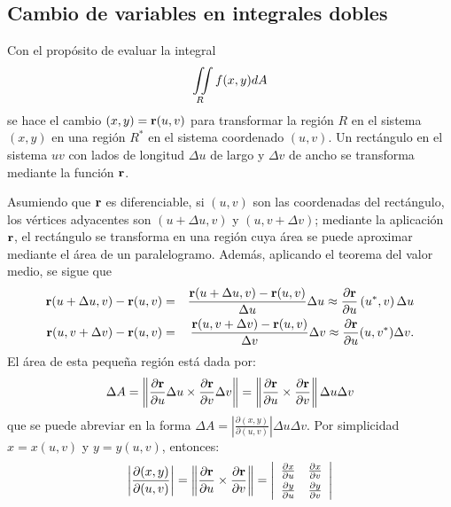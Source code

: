\subsection{Cambio de variables en integrales dobles} \label{cambioidobles}

Con el propósito de evaluar la integral \[\displaystyle \iint\limits_{R}f(x,y) dA\]
se hace el cambio $(x,y) ={\bf r}(u,v)$ para transformar la región $R$ en el sistema
$(x,y) $ en una región $R^{\ast }$ en el sistema coordenado  $(u,v)$.
Un rectángulo en el sistema $uv$ con lados de longitud $\Delta u$ de largo y $\Delta v$ de ancho se transforma mediante la función ${\bf r}$.

Asumiendo que ${\bf r}$ es diferenciable, si $(u,v) $ son las coordenadas del rectángulo, los vértices
adyacentes son $( u+\Delta u,v) $ y $(u,v+\Delta v)$; mediante la aplicación ${\bf r}$, el rectángulo
se transforma en una región cuya área se puede aproximar mediante el área de un paralelogramo. Además,
aplicando el teorema del valor medio, se sigue que
\begin{eqnarray*}
{\bf r}(u+\Delta u,v) -{\bf r}(u,v) &=& \frac{{\bf r}( u+\Delta u,v)-{\bf r}(u,v)}{\Delta u}\Delta u
\approx \frac{\partial {\bf r}}{\partial u}\left( u^{\ast},v\right)\Delta u \\
{\bf r}(u,v+\Delta v) -{\bf r}(u,v) &=& \frac{{\bf r}(u,v+\Delta v)-{\bf r}(u,v)}{\Delta v}\Delta v
\approx \frac{\partial{\bf r}}{\partial u}( u,v^{\ast})\Delta v.
\end{eqnarray*}
El área de esta pequeña región está dada por:
\begin{equation}
\Delta A=\left\Vert \frac{\partial {\bf r}}{\partial u}\Delta u\times
\frac{\partial {\bf r}}{\partial v}\Delta v\right\Vert =\left\Vert \frac{\partial {\bf r}}{\partial u}\times \frac{\partial {\bf r}}{\partial v}\right\Vert \Delta u\Delta v
\end{equation}
que se puede abreviar en la forma
$\Delta A=\left\vert \frac{\partial (x,y)}{\partial (u,v)}\right \vert \Delta u\Delta v$.
Por simplicidad $x=x(u,v)$ y $y=y(u,v)$, entonces:
\begin{equation}
\left\vert \frac{\partial (x,y) }{\partial(u,v)}\right\vert =\left\Vert\frac{\partial{\bf r}}{\partial u}\times \frac{\partial{\bf r}}{\partial v}\right\Vert =
\left\vert
\begin{array}{cc}\frac{\partial x}{\partial u}&\frac{\partial x}{\partial v}\\[.1cm]
\frac{\partial y}{\partial u} & \frac{\partial y}{\partial v}
\end{array} \right\vert
\end{equation}

